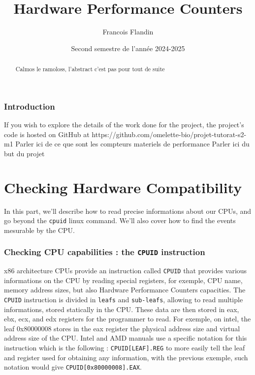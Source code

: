 \documentclass{rapport}
\title{Hardware Performance Counters}
\author{Francois Flandin}
\date{Second semestre de l'année 2024-2025}
\begin{document}
	\maketitle

	\begin{abstract}
	Calmos le ramoloss, l'abstract c'est pas pour tout de suite
	\end{abstract}

	\clearpage
	\tableofcontents
	\clearpage
	\section{Introduction}
	If you wish to explore the details of the work done for the project, the project's code is hosted on GitHub at https://github.com/omelette-bio/projet-tutorat-s2-m1
	Parler ici de ce que sont les compteurs materiels de performance 
	Parler ici du but du projet 


	\clearpage

	\part{Checking Hardware Compatibility}

	In this part, we'll describe how to read precise informations about our CPUs, and go beyond the \texttt{cpuid} linux command. We'll also cover how to find the events mesurable by the CPU.

	\section{Checking CPU capabilities : the \texttt{CPUID} instruction}

	x86 architecture CPUs provide an instruction called \texttt{CPUID} that provides various informations on the CPU by reading special registers, for exemple, CPU name, memory address sizes, but also Hardware Performance Counters capacities.\newline
	The \texttt{CPUID} instruction is divided in \texttt{leafs} and \texttt{sub-leafs}, allowing to read multiple informations, stored statically in the CPU. These data are then stored in eax, ebx, ecx, and edx registers for the programmer to read.\newline
	For exemple, on intel, the leaf 0x80000008 stores in the eax register the physical address size and virtual address size of the CPU.\newline
	Intel and AMD manuals use a specific notation for this instruction which is the following : \texttt{CPUID[LEAF].REG} to more easily tell the leaf and register used for obtaining any information, with the previous exemple, such notation would give \texttt{CPUID[0x80000008].EAX}.
\end{document}

